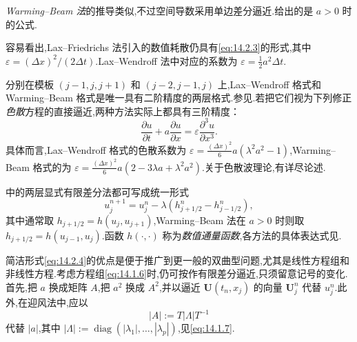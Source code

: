 \emph{Warming--Beam 法}的推导类似,不过空间导数采用单边差分逼近.给出的是 \(a>0\) 时的公式.

容易看出,Lax--Friedrichs 法引入的数值耗散仍具有\eqref{eq:14.2.3}的形式,其中 \(\varepsilon=(\Delta x)^2/(2\Delta t)\).Lax--Wendroff 法中对应的系数为 \(\varepsilon=\tfrac12a^2\Delta t\).

分别在模板 \((j-1,j,j+1)\) 和 \((j-2,j-1,j)\) 上,Lax--Wendroff 格式和 Warming--Beam 格式是唯一具有二阶精度的两层格式.参见.若把它们视为下列修正\emph{色散}方程的直接逼近,两种方法实际上都具有三阶精度：
\[
  \frac{\partial u}{\partial t}+a\frac{\partial u}{\partial x}
    =\varepsilon\frac{\partial^3u}{\partial x^3}.
\]
具体而言,Lax--Wendroff 格式的色散系数为 \(\varepsilon=\tfrac{(\Delta x)^2}{6}a(\lambda^2a^2-1)\),Warming--Beam 格式的为 \(\varepsilon=\tfrac{(\Delta x)^2}{6}a(2-3\lambda a+\lambda^2a^2)\).关于色散波理论,有详尽论述.

中的两层显式有限差分法都可写成统一形式
\begin{equation}\label{eq:14.2.4}
  u_j^{n+1}=u_j^n-\lambda(h_{j+1/2}^n-h_{j-1/2}^n),
\end{equation}
其中通常取 \(h_{j+1/2}=h(u_j,u_{j+1})\),Warming--Beam 法在 \(a>0\) 时则取 \(h_{j+1/2}=h(u_{j-1},u_j)\).函数 \(h(\cdot,\cdot)\) 称为\emph{数值通量函数},各方法的具体表达式见.

简洁形式\eqref{eq:14.2.4}的优点是便于推广到更一般的双曲型问题,尤其是线性方程组和非线性方程.考虑方程组\eqref{eq:14.1.6}时,仍可按作有限差分逼近,只须留意记号的变化.首先,把 \(a\) 换成矩阵 \(A\),把 \(a^2\) 换成 \(A^2\),并以逼近 \(\boldsymbol{U}(t_n,x_j)\) 的向量 \(\boldsymbol{U}_j^n\) 代替 \(u_j^n\).此外,在迎风法中,应以
\begin{equation}\label{eq:14.2.5}
  |A|:=T|\Lambda|T^{-1}
\end{equation}
代替 \(|a|\),其中 \(|\Lambda|:=\operatorname{diag}(|\lambda_1|,\ldots,|\lambda_p|)\),见\eqref{eq:14.1.7}.

